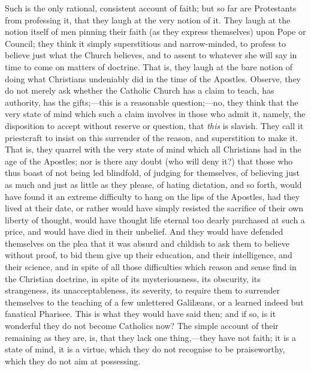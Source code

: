 Such is the only rational, consistent account of faith; but so far
are Protestants from professing it, that they laugh at the very notion
of it. They laugh at the notion itself of men pinning their faith (as
they express themselves) upon Pope or Council; they think it simply
superstitious and narrow-minded, to profess to believe just what the
Church believes, and to assent to whatever she will say in time to
come on matters of doctrine. That is, they laugh at the bare notion of
doing what Christians undeniably did in the time of the Apostles.
Observe, they do not merely ask whether the Catholic Church has a
claim to teach, has authority, has the gifts;—this is a reasonable
question;—no, they think that the very state of mind which such a
claim involves in those who admit it, namely, the disposition to
accept without reserve or question, that \emph{this} is slavish. They
call it priestcraft to insist on this surrender of the reason, and
superstition to make it. That is, they quarrel with the very state of
mind which all Christians had in the age of the Apostles; nor is there
any doubt (who will deny it?) that those who thus boast of not being
led blindfold, of judging for themselves, of believing just as much
and just as little as they please, of hating dictation, and so forth,
would have found it an extreme difficulty to hang on the lips of the
Apostles, had they lived at their date, or rather would have simply
resisted the sacrifice of their own liberty of thought, would have
thought life eternal too dearly purchased at such a price, and would
have died in their unbelief. And they would have defended themselves
on the plea that it was absurd and childish to ask them to believe
without proof, to bid them give up their education, and their
intelligence, and their science, and in spite of all those
difficulties which reason and sense find in the Christian doctrine, in
spite of its mysteriousness, its obscurity, its strangeness, its
unacceptableness, its severity, to require them to surrender
themselves to the teaching of a few unlettered Galilæans, or a
learned indeed but fanatical Pharisee. This is what they would have
said then; and if so, is it wonderful they do not become Catholics
now? The simple account of their remaining as they are, is, that they
lack one thing,—they have not faith; it is a state of mind, it is a
virtue, which they do not recognise to be praiseworthy, which they do
not aim at possessing.

